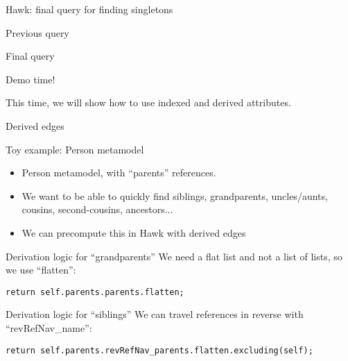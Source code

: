 \begin{frame}[fragile]{Hawk: final query for finding singletons}
  \begin{block}{Previous query}
    
  \end{block}

  \begin{block}{Final query}
    
  \end{block}
\end{frame}

\begin{frame}[standout]
  Demo time!

  This time, we will show how to use indexed and derived attributes.
\end{frame}

\begin{frame}[fragile]{Derived edges}
  \begin{block}{Toy example: Person metamodel}
    \begin{itemize}
    \item Person metamodel, with ``parents'' references.
    \item We want to be able to quickly find siblings, grandparents,
      uncles/aunts, cousins, second-cousins, ancestors...
    \item We can precompute this in Hawk with \alert{derived edges}
    \end{itemize}
  \end{block}

  \begin{block}{Derivation logic for ``grandparents''}
    \vspace{.3em}
    We need a flat list and not a list of lists, so we use ``flatten'':
    \begin{lstlisting}[language=EOL]
      return self.parents.parents.flatten;
    \end{lstlisting}
  \end{block}

  \begin{block}{Derivation logic for ``siblings''}
    \vspace{.3em}
    We can travel references in reverse with ``revRefNav\_name'':

    \begin{lstlisting}[language=EOL]
      return self.parents.revRefNav_parents.flatten.excluding(self);
    \end{lstlisting}
  \end{block}

\end{frame}

